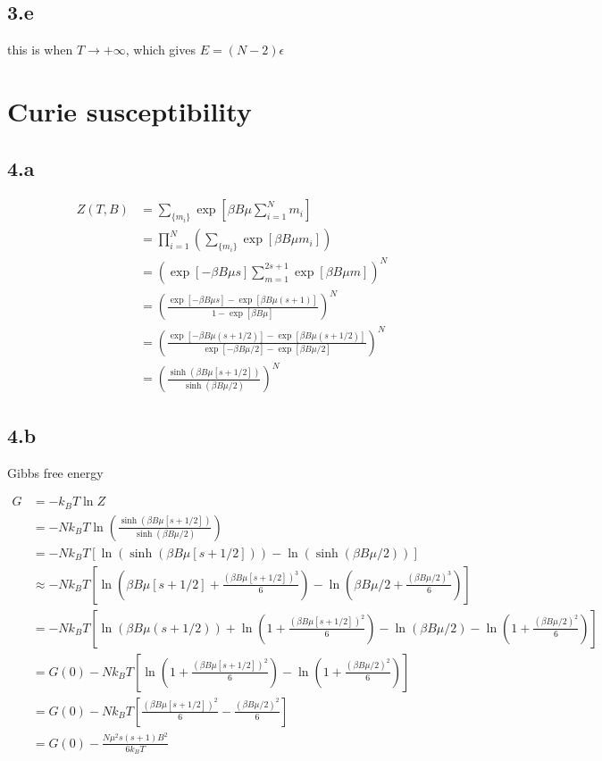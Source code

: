 \documentclass{article}
\begin{document}
\subsection*{3.e}

this is when $T \rightarrow +\infty$, which gives $E = (N-2)\epsilon$


\section*{Curie susceptibility}
\subsection*{4.a}

$$
\begin{aligned}
    Z(T, B) &= \sum_{\{m_i\}} \exp[\beta B\mu \sum_{i=1}^{N} m_i]\\
    &= \prod_{i=1}^N (\sum_{\{m_i\}}\exp[\beta B\mu m_i])\\
    &= (\exp[-\beta B\mu s] \sum_{m = 1}^{2s+1} \exp[\beta B\mu m])^N\\
    &= (\frac{\exp[-\beta B\mu s]- \exp[\beta B\mu (s+1)]}{1 - \exp[\beta B\mu]})^N\\
    &= (\frac{\exp[-\beta B\mu (s + 1/2)]- \exp[\beta B\mu (s+1/2)]}{\exp[-\beta B\mu/2] - \exp[\beta B\mu/2]})^N\\
    &= (\frac{\sinh(\beta B\mu[s + 1/2])}{\sinh(\beta B\mu/2)})^N
\end{aligned}
$$

\subsection*{4.b}

Gibbs free energy

$$
\begin{aligned}
    G &= -k_B T \ln Z\\
    &= -N k_B T \ln(\frac{\sinh(\beta B\mu[s + 1/2])}{\sinh(\beta B\mu/2)})\\
    &= -N k_B T [\ln(\sinh(\beta B\mu[s + 1/2])) - \ln(\sinh(\beta B\mu/2))]\\
    &\approx -N k_B T [\ln(\beta B\mu[s + 1/2] + \frac{(\beta B\mu[s + 1/2])^3}{6}) - \ln(\beta B\mu/2 + \frac{(\beta B\mu/2)^3}{6})]\\
    &= -N k_B T [\ln(\beta B\mu (s+1/2)) + \ln(1 + \frac{(\beta B\mu[s + 1/2])^2}{6}) - \ln(\beta B\mu/2) - \ln(1 + \frac{(\beta B\mu/2)^2}{6})]\\
    &= G(0) -N k_B T [\ln(1 + \frac{(\beta B\mu[s + 1/2])^2}{6}) - \ln(1 + \frac{(\beta B\mu/2)^2}{6})]\\
    &= G(0) -N k_B T [\frac{(\beta B\mu[s + 1/2])^2}{6} - \frac{(\beta B\mu/2)^2}{6}]\\
    &= G(0) - \frac{N\mu^2 s(s+1) B^2}{6k_B T}
\end{aligned}
$$
\end{document}
